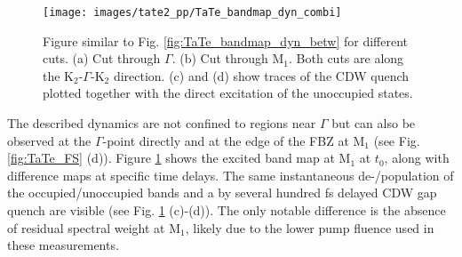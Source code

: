 \begin{figure}[t!]
	\centering
	\texttt{[image: images/tate2\_pp/TaTe\_bandmap\_dyn\_combi]}
	\caption{Figure similar to Fig. \ref{fig:TaTe_bandmap_dyn_betw} for different cuts. (a) Cut through $\Gamma$. (b) Cut through M$_1$. Both cuts are along the K$_2$-$\Gamma$-K$_2$ direction. (c) and (d) show traces of the CDW quench plotted together with the direct excitation of the unoccupied states.}
	\label{fig:TaTe_bandmap_dyn_bzb}
\end{figure}

The described dynamics are not confined to regions near $\Gamma$ but can also be observed at the $\Gamma$-point directly and at the edge of the FBZ at M$_1$ (see Fig. \ref{fig:TaTe_FS} (d)).
Figure \ref{fig:TaTe_bandmap_dyn_bzb} shows the excited band map at M$_1$ at $t_0$, along with difference maps at specific time delays.
The same instantaneous de-/population of the occupied/unoccupied bands and a by several hundred \unit{\femto\second} delayed CDW gap quench are visible (see Fig. \ref{fig:TaTe_bandmap_dyn_bzb} (c)-(d)).
The only notable difference is the absence of residual spectral weight at M$_1$, likely due to the lower pump fluence used in these measurements.

